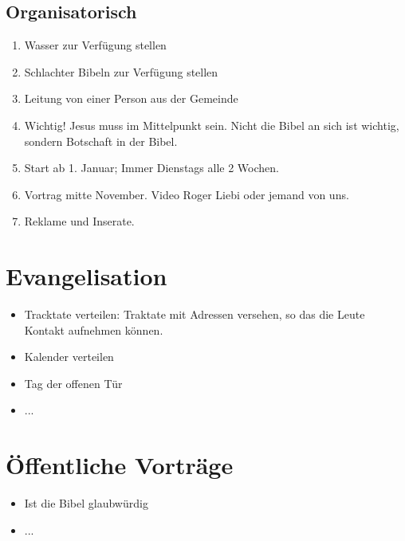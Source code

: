 \documentclass{mybib}
\begin{document}
    \subsection{Organisatorisch}
    \begin{enumerate}
        \item Wasser zur Verfügung stellen
        \item Schlachter Bibeln zur Verfügung stellen
        \item Leitung von einer Person aus der Gemeinde
        \item Wichtig! Jesus muss im Mittelpunkt sein. Nicht die Bibel an sich ist wichtig, sondern Botschaft in der Bibel.
        \item Start ab 1. Januar; Immer Dienstags alle 2 Wochen.
        \item Vortrag mitte November. Video Roger Liebi oder jemand von uns.
        \item Reklame und Inserate.
    \end{enumerate}
    \section{Evangelisation}
    \begin{itemize}
        \item Tracktate verteilen: Traktate mit Adressen versehen, so das die Leute Kontakt aufnehmen können.
        \item Kalender verteilen
        \item Tag der offenen Tür
        \item ...
    \end{itemize}
    \section{Öffentliche Vorträge}
    \begin{itemize}
        \item Ist die Bibel glaubwürdig
        \item ...
    \end{itemize}
    
    
\end{document}
